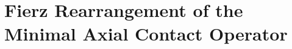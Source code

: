 \documentclass[aps,prd,twocolumn,superscriptaddress,showpacs,preprintnumbers,nofootinbib,longbibliography,floatfix]{revtex4-2}
\newcommand{\MPl}{M_{\rm Pl}}
\begin{document}

\section{Fierz Rearrangement of the Minimal Axial Contact Operator}
\label{app:fierz}
\end{document}
